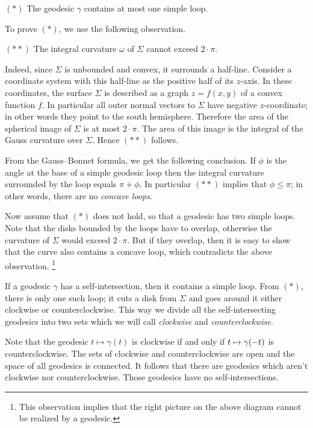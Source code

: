 \begin{cl}{$({*})$}
The geodesic $\gamma$ contains at most one simple loop.
\end{cl}

To prove $({*})$, we use the following observation.

\begin{cl}{$({*}{*})$}
The integral curvature $\omega$ of $\Sigma$ cannot exceed $2\cdot\pi$.
\end{cl}

Indeed, since $\Sigma$ is unbounded and convex,
it surrounds a half-line.
Consider a coordinate system with this half-line as the positive half of its $z$-axis. 
In these coordinates, the surface $\Sigma$ is described as a graph $z=f(x,y)$ of a convex function $f$.
In particular all outer normal vectors to $\Sigma$ have negative $z$-coordinate;
in other words they point to the south hemisphere.
Therefore the area of the spherical image of $\Sigma$ is at most $2\cdot\pi$.
The area of this image is the integral of the Gauss curvature over $\Sigma$. 
Hence $({*}{*})$ follows.

From the Gauss--Bonnet formula, we get the following conclusion.
If $\phi$ is the angle at the base of a simple geodesic loop then the integral curvature surrounded by the loop equals $\pi+\phi$. 
In particular $({*}{*})$ implies that $\phi\le\pi$; in other words, there are no \emph{concave loops}.

Now assume that $({*})$ does not hold, so that a geodesic has two simple loops.
Note that the disks bounded by the loops  have to overlap,
otherwise the curvature of $\Sigma$ would exceed $2\cdot\pi$.
But if they overlap, then it is easy to show that the curve also contains a concave loop, 
which contradicts the above observation.%
\footnote{This observation implies that the right picture on the above diagram cannot be realized by a geodesic.}

If a geodesic $\gamma$ has a self-intersection,
then it contains a simple loop.
From $({*})$, there is only one such loop;
it cuts a disk from $\Sigma$ 
and goes around it either clockwise or counterclockwise.
This way we divide all the self-intersecting geodesics 
into two sets which we will call {}\emph{clockwise} and {}\emph{counterclockwise}.

Note that the geodesic $t\mapsto \gamma(t)$ is clockwise 
if and only if 
$t\z\mapsto \gamma(-t)$
is counterclockwise.
The sets of clockwise and counterclockwise are open and the space of all geodesics is connected. 
It follows that there are geodesics 
which aren't clockwise nor counterclockwise.
Those geodesics have no self-intersections.\qeds

